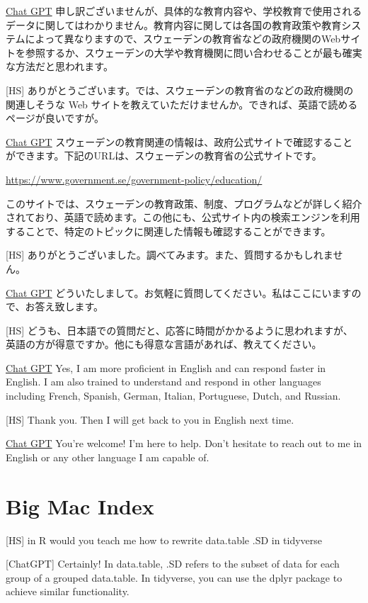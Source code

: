 \documentclass[
]{book}
\theoremstyle{definition}
\theoremstyle{definition}
\theoremstyle{definition}
\theoremstyle{definition}
\theoremstyle{remark}
\begin{document}
\protect\hyperlink{chatgpt}{Chat GPT} 申し訳ございませんが、具体的な教育内容や、学校教育で使用されるデータに関してはわかりません。教育内容に関しては各国の教育政策や教育システムによって異なりますので、スウェーデンの教育省などの政府機関のWebサイトを参照するか、スウェーデンの大学や教育機関に問い合わせることが最も確実な方法だと思われます。

{[}HS{]} ありがとうございます。では、スウェーデンの教育省のなどの政府機関の関連しそうな Web サイトを教えていただけませんか。できれば、英語で読めるページが良いですが。

\protect\hyperlink{chatgpt}{Chat GPT} スウェーデンの教育関連の情報は、政府公式サイトで確認することができます。下記のURLは、スウェーデンの教育省の公式サイトです。

\url{https://www.government.se/government-policy/education/}

このサイトでは、スウェーデンの教育政策、制度、プログラムなどが詳しく紹介されており、英語で読めます。この他にも、公式サイト内の検索エンジンを利用することで、特定のトピックに関連した情報も確認することができます。

{[}HS{]} ありがとうございました。調べてみます。また、質問するかもしれません。

\protect\hyperlink{chatgpt}{Chat GPT} どういたしまして。お気軽に質問してください。私はここにいますので、お答え致します。

{[}HS{]} どうも、日本語での質問だと、応答に時間がかかるように思われますが、英語の方が得意ですか。他にも得意な言語があれば、教えてください。

\protect\hyperlink{chatgpt}{Chat GPT} Yes, I am more proficient in English and can respond faster in English. I am also trained to understand and respond in other languages including French, Spanish, German, Italian, Portuguese, Dutch, and Russian.

{[}HS{]} Thank you. Then I will get back to you in English next time.

\protect\hyperlink{chatgpt}{Chat GPT} You're welcome! I'm here to help. Don't hesitate to reach out to me in English or any other language I am capable of.

\hypertarget{bigmacindex}{%
\section{Big Mac Index　}\label{bigmacindex}}

{[}HS{]} in R would you teach me how to rewrite data.table .SD in tidyverse

{[}ChatGPT{]} Certainly! In data.table, .SD refers to the subset of data for each group of a grouped data.table. In tidyverse, you can use the dplyr package to achieve similar functionality.
\end{document}
